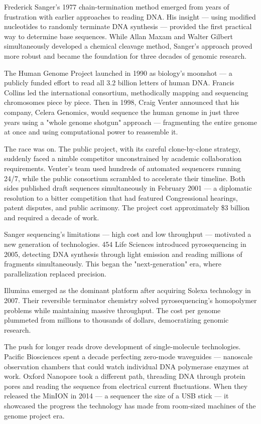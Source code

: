 \begin{historical}
Frederick Sanger's 1977 chain-termination method emerged from years of frustration with earlier approaches to reading DNA. His insight — using modified nucleotides to randomly terminate DNA synthesis — provided the first practical way to determine base sequences. While Allan Maxam and Walter Gilbert simultaneously developed a chemical cleavage method, Sanger's approach proved more robust and became the foundation for three decades of genomic research.

The Human Genome Project launched in 1990 as biology's moonshot — a publicly funded effort to read all 3.2 billion letters of human DNA. Francis Collins led the international consortium, methodically mapping and sequencing chromosomes piece by piece. Then in 1998, Craig Venter announced that his company, Celera Genomics, would sequence the human genome in just three years using a "whole genome shotgun" approach — fragmenting the entire genome at once and using computational power to reassemble it.

The race was on. The public project, with its careful clone-by-clone strategy, suddenly faced a nimble competitor unconstrained by academic collaboration requirements. Venter's team used hundreds of automated sequencers running 24/7, while the public consortium scrambled to accelerate their timeline. Both sides published draft sequences simultaneously in February 2001 — a diplomatic resolution to a bitter competition that had featured Congressional hearings, patent disputes, and public acrimony. The project cost approximately \$3 billion and required a decade of work.

Sanger sequencing's limitations — high cost and low throughput — motivated a new generation of technologies. 454 Life Sciences introduced pyrosequencing in 2005, detecting DNA synthesis through light emission and reading millions of fragments simultaneously. This began the "next-generation" era, where parallelization replaced precision.

Illumina emerged as the dominant platform after acquiring Solexa technology in 2007. Their reversible terminator chemistry solved pyrosequencing's homopolymer problems while maintaining massive throughput. The cost per genome plummeted from millions to thousands of dollars, democratizing genomic research.

The push for longer reads drove development of single-molecule technologies. Pacific Biosciences spent a decade perfecting zero-mode waveguides — nanoscale observation chambers that could watch individual DNA polymerase enzymes at work. Oxford Nanopore took a different path, threading DNA through protein pores and reading the sequence from electrical current fluctuations. When they released the MinION in 2014 — a sequencer the size of a USB stick — it showcased the progress the technology has made from room-sized machines of the genome project era.


\end{historical}
